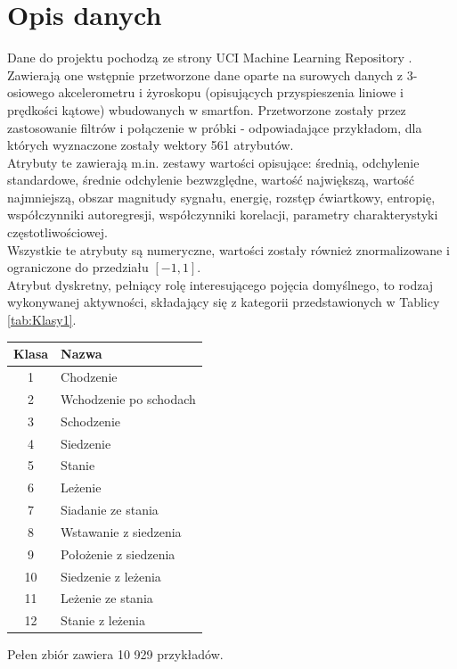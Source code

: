 \documentclass[a4paper,10pt]{article}
\begin{document}
	\section{Opis danych}
	Dane do projektu pochodzą ze strony UCI Machine Learning Repository \cite{data-source}.
	Zawierają one wstępnie przetworzone dane oparte na surowych danych z 3-osiowego akcelerometru i żyroskopu (opisujących przyspieszenia liniowe i prędkości kątowe) wbudowanych w smartfon.
	Przetworzone zostały przez zastosowanie filtrów i połączenie w próbki - odpowiadające przykładom, dla których wyznaczone zostały wektory 561 atrybutów.\\
	Atrybuty te zawierają m.in. zestawy wartości opisujące: średnią, odchylenie standardowe, średnie odchylenie bezwzględne, wartość największą, wartość najmniejszą, obszar magnitudy sygnału, energię, rozstęp ćwiartkowy, entropię, współczynniki autoregresji, współczynniki korelacji, parametry charakterystyki częstotliwościowej.\\
	Wszystkie te atrybuty są numeryczne, wartości zostały również znormalizowane i ograniczone do przedziału $[-1, 1]$.\\
	Atrybut dyskretny, pełniący rolę interesującego pojęcia domyślnego, to rodzaj wykonywanej aktywności, składający się z kategorii przedstawionych w Tablicy \ref{tab:Klasy1}.
	\begin{center}
		\begin{tabular}{c | L{4.5cm}} 
			Klasa & Nazwa \\ & Chodzenie \\
	        2 & Wchodzenie po schodach \\
	        3 & Schodzenie \\
	        4 & Siedzenie \\
	        5 & Stanie \\
	        6 & Leżenie \\
	        7 & Siadanie ze stania \\
	        8 & Wstawanie z siedzenia \\
            9 & Położenie z siedzenia \\ 
            10 & Siedzenie z leżenia \\
            11 & Leżenie ze stania \\
            12 & Stanie z leżenia \\
			\hline
		\end{tabular}
		\label{tab:Klasy1}
	\end{center}
	Pełen zbiór zawiera 10 929 przykładów.
	
\end{document}
